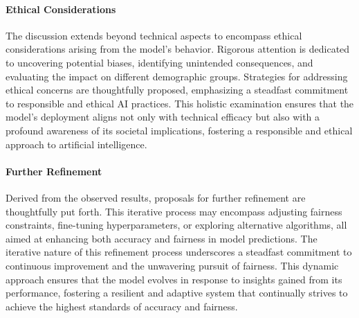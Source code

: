 \paragraph{Ethical Considerations}

The discussion extends beyond technical aspects to encompass ethical considerations arising from the model's behavior. Rigorous attention is dedicated to uncovering potential biases, identifying unintended consequences, and evaluating the impact on different demographic groups. Strategies for addressing ethical concerns are thoughtfully proposed, emphasizing a steadfast commitment to responsible and ethical AI practices. This holistic examination ensures that the model's deployment aligns not only with technical efficacy but also with a profound awareness of its societal implications, fostering a responsible and ethical approach to artificial intelligence.

\paragraph{Further Refinement}

Derived from the observed results, proposals for further refinement are thoughtfully put forth. This iterative process may encompass adjusting fairness constraints, fine-tuning hyperparameters, or exploring alternative algorithms, all aimed at enhancing both accuracy and fairness in model predictions. The iterative nature of this refinement process underscores a steadfast commitment to continuous improvement and the unwavering pursuit of fairness. This dynamic approach ensures that the model evolves in response to insights gained from its performance, fostering a resilient and adaptive system that continually strives to achieve the highest standards of accuracy and fairness.

